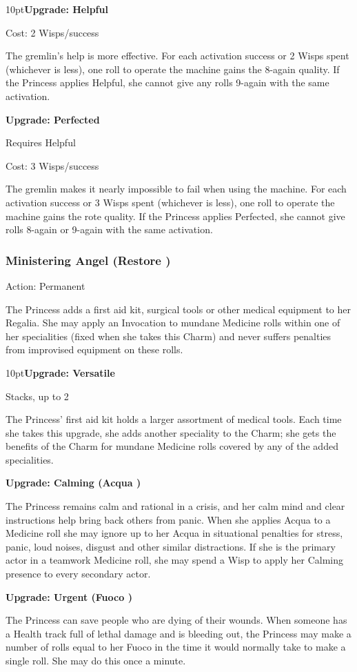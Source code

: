 \begin{myindentpar}{10pt}\textbf{Upgrade: Helpful}

\noindent Cost: 2 Wisps/success

The gremlin's help is more effective. For each activation success or 2 Wisps spent (whichever is less), one roll to operate the machine gains the 8-again quality. If the Princess applies Helpful, she cannot give any rolls 9-again with the same activation.

\textbf{Upgrade: Perfected}

Requires Helpful

\noindent Cost: 3 Wisps/success

The gremlin makes it nearly impossible to fail when using the machine. For each activation success or 3 Wisps spent (whichever is less), one roll to operate the machine gains the rote quality. If the Princess applies Perfected, she cannot give rolls 8-again or 9-again with the same activation.\end{myindentpar}

\subsubsection*{Ministering Angel (Restore \textbullet)}

\noindent Action: Permanent

The Princess adds a first aid kit, surgical tools or other medical equipment to her Regalia. She may apply an Invocation to mundane Medicine rolls within one of her specialities (fixed when she takes this Charm) and never suffers penalties from improvised equipment on these rolls.
\begin{myindentpar}{10pt}\textbf{Upgrade: Versatile}

Stacks, up to 2

The Princess' first aid kit holds a larger assortment of medical tools. Each time she takes this upgrade, she adds another speciality to the Charm; she gets the benefits of the Charm for mundane Medicine rolls covered by any of the added specialities.

\textbf{Upgrade: Calming (Acqua \textbullet)}

The Princess remains calm and rational in a crisis, and her calm mind and clear instructions help bring back others from panic. When she applies Acqua to a Medicine roll she may ignore up to her Acqua in situational penalties for stress, panic, loud noises, disgust and other similar distractions. If she is the primary actor in a teamwork Medicine roll, she may spend a Wisp to apply her Calming presence to every secondary actor.

\textbf{Upgrade: Urgent (Fuoco \textbullet)}

The Princess can save people who are dying of their wounds. When someone has a Health track full of lethal damage and is bleeding out, the Princess may make a number of rolls equal to her Fuoco in the time it would normally take to make a single roll. She may do this once a minute.\end{myindentpar}

